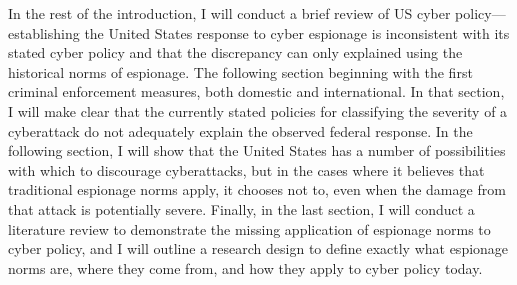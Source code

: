\documentclass{memoir}
\begin{document}
\begin{refsegment}
In the rest of the introduction, I will conduct a brief review of US cyber policy---establishing the United States response to cyber espionage is inconsistent with its stated cyber policy and that the discrepancy can only explained using the historical norms of espionage. The following section beginning with the first criminal enforcement measures, both domestic and international. In that section, I will make clear that the currently stated policies for classifying the severity of a cyberattack do not adequately explain the observed federal response. In the following section, I will show that the United States has a number of possibilities with which to discourage cyberattacks, but in the cases where it believes that traditional espionage norms apply, it chooses not to, even when the damage from that attack is potentially severe. Finally, in the last section, I will conduct a literature review to demonstrate the missing application of espionage norms to cyber policy, and I will outline a research design to define exactly what espionage norms are, where they come from, and how they apply to cyber policy today.





\end{refsegment}
\end{document}
